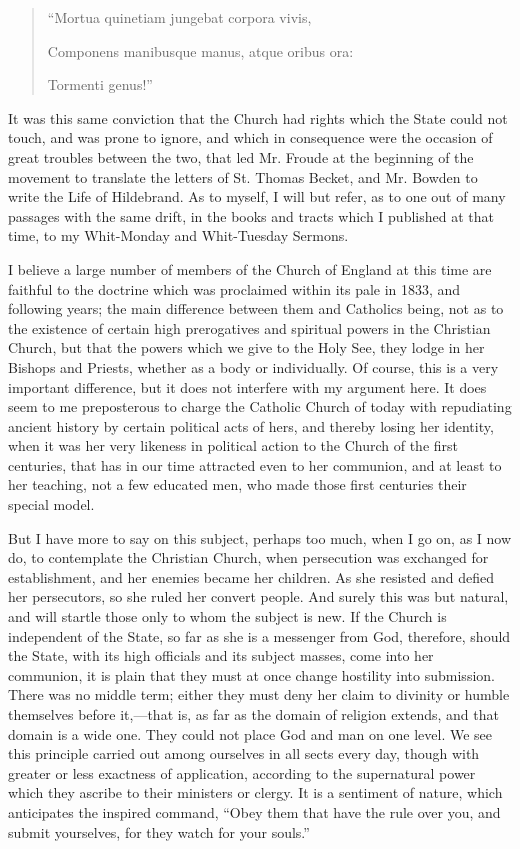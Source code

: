 \begin{quote}

``Mortua quinetiam jungebat corpora vivis,

Componens manibusque manus, atque oribus ora:

Tormenti genus!''

\end{quote}

It was this same conviction that the Church had rights which the
State could not touch, and was prone to ignore, and which in
consequence were the occasion of great troubles between the two, that
led Mr. Froude at the beginning of the movement to translate the letters
of St. Thomas Becket, and Mr. Bowden to write the Life of Hildebrand. As
to myself, I will but refer, as to one out of many passages with the
same drift, in the books and tracts which I published at that time, to
my Whit-Monday and Whit-Tuesday Sermons.

I believe a large number of members of the Church of England at this
time are faithful to the doctrine which was proclaimed within its pale
in 1833, and following years; the main difference between them and
Catholics being, not as to the existence of certain high prerogatives
and spiritual powers in the Christian Church, but that the powers which
we give to the Holy See, they lodge in her Bishops and Priests, whether
as a body or individually. Of course, this is a very important
difference, but it does not interfere with my argument here. It does
seem to me preposterous to charge the Catholic Church of today with
repudiating ancient history by certain political acts of hers, and
thereby losing her identity, when it was her very likeness in political
action to the Church of the first centuries, that has in our time
attracted even to her communion, and at least to her teaching, not a few
educated men, who made those first centuries their special model.

But I have more to say on this subject, perhaps too much, when I go
on, as I now do, to contemplate the Christian Church, when persecution
was exchanged for establishment, and her enemies became her children. As
she resisted and defied her persecutors, so she ruled her convert
people. And surely this was but natural, and will startle those only to
whom the subject is new. If the Church is independent of the State, so
far as she is a messenger from God, therefore, should the State, with
its high officials and its subject masses, come into her communion, it
is plain that they must at once change hostility into submission. There
was no middle term; either they must deny her claim to divinity or
humble themselves before it,—that is, as far as the domain of religion
extends, and that domain is a wide one. They could not place God and man
on one level. We see this principle carried out among ourselves in all
sects every day, though with greater or less exactness of application,
according to the supernatural power which they ascribe to their
ministers or clergy. It is a sentiment of nature, which anticipates the
inspired command, ``Obey them that have the rule over you, and
submit yourselves, for they watch for your souls.''

